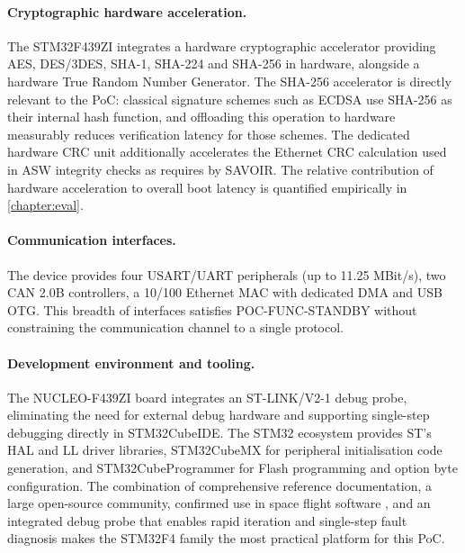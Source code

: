 \paragraph{Cryptographic hardware acceleration.} The STM32F439ZI integrates a hardware cryptographic accelerator providing AES, DES/3DES, SHA-1, SHA-224 and SHA-256 in hardware, alongside a hardware True Random Number Generator. The SHA-256 accelerator is directly relevant to the PoC: classical signature schemes such as ECDSA use SHA-256 as their internal hash function, and offloading this operation to hardware measurably reduces verification latency for those schemes. The dedicated hardware CRC unit additionally accelerates the Ethernet CRC calculation used in ASW integrity checks as requires by SAVOIR. The relative contribution of hardware acceleration to overall boot latency is quantified empirically in \autoref{chapter:eval}.

\paragraph{Communication interfaces.} The device provides four USART/UART peripherals (up to 11.25 MBit/s), two CAN 2.0B controllers, a 10/100 Ethernet MAC with dedicated DMA and USB OTG. This breadth of interfaces satisfies POC-FUNC-STANDBY without constraining the communication channel to a single protocol.

\paragraph{Development environment and tooling.} The NUCLEO-F439ZI board integrates an ST-LINK/V2-1 debug probe, eliminating the need for external debug hardware and supporting single-step debugging directly in STM32CubeIDE. The STM32 ecosystem provides ST's HAL and LL driver libraries, STM32CubeMX for peripheral initialisation code generation, and STM32CubeProgrammer for Flash programming and option byte configuration. The combination of comprehensive reference documentation, a large open-source community, confirmed use in space flight software \cite{space_odyssey_2023, cubesat_fsw_design, cubesat_fsw_development, cubesat_flight_software}, and an integrated debug probe that enables rapid iteration and single-step fault diagnosis makes the STM32F4 family the most practical platform for this PoC.